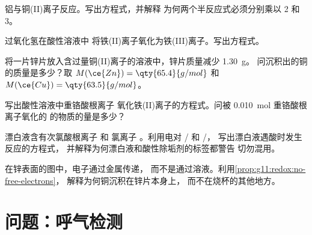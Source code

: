 \begin{exercise}[$\star\star$]\label{exo:g11:redox:10}
铝与铜(II)离子反应。写出方程式，并解释
为何两个半反应式必须分别乘以 2 和 3。
\end{exercise}

\begin{exercise}[$\star\star$]\label{exo:g11:redox:11}
过氧化氢在酸性溶液中
将铁(II)离子氧化为铁(III)离子。写出方程式。
\end{exercise}

\begin{exercise}[$\star\star\star$]\label{exo:g11:redox:12}
将一片锌片放入含过量铜(II)离子的溶液中，锌片质量减少 \qty{1.30}{g}。
问沉积出的铜的质量是多少？取
$M(\ce{Zn}) = \qty{65.4}{g/mol}$ 和 $M(\ce{Cu}) = \qty{63.5}{g/mol}$。
\end{exercise}

\begin{exercise}[$\star\star\star$]\label{exo:g11:redox:13}
写出酸性溶液中重铬酸根离子
氧化铁(II)离子的方程式。问被
\qty{0.010}{mol} 重铬酸根离子氧化的  的物质的量是多少？
\end{exercise}

\begin{exercise}[$\star\star\star$]\label{exo:g11:redox:14}
漂白液含有次氯酸根离子  和
氯离子 。利用电对 / 和 /，
写出漂白液遇酸时发生反应的方程式，
并解释为何漂白液和酸性除垢剂的标签都警告
切勿混用。
\end{exercise}

\begin{exercise}[$\star\star\star$]\label{exo:g11:redox:15}
在锌表面的图中，电子通过金属传递，
而不是通过溶液。利用\cref{prop:g11:redox:no-free-electrons}，
解释为何铜沉积在锌片本身上，
而不在烧杯的其他地方。
\end{exercise}

\section{问题：呼气检测}

